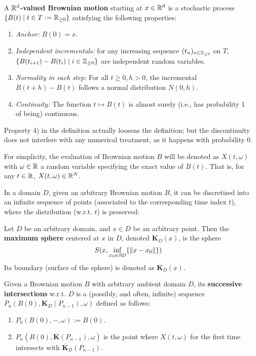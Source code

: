 \documentclass[10pt]{article}
\begin{document}
\begin{definition}
    A \textbf{$\mathbb{R}^d$-valued Brownian motion} starting at $x \in \mathbb{R}^d$ is a stochastic process $\{ B(t) \mid t \in T := \mathbb{R}_{\geq 0} \}$ satisfying the following properties:
    \begin{enumerate}[label=\arabic*)]
        \item \emph{Anchor:} $B(0) = x$.
        \item \emph{Independent incrementals:} for any increasing sequence $(t_n)_{n \in \mathbb{Z}_{\geq 0}}$ on $T$, $\{ B(t_{i+1}) - B(t_i) \mid i \in \mathbb{Z}_{\geq 0} \}$ are independent random variables.
        \item \emph{Normality in each step:} For all $t \geq 0, h > 0$, the incremental $B(t + h) - B(t)$ follows a normal distribution $N(0, h)$.
        \item \emph{Continuity:} The function $t \mapsto B(t)$ is almost surely (i.e., has probability 1 of being) continuous.
    \end{enumerate}
\end{definition}
\nogap
\begin{remark}
    Property 4) in the definition actually loosens the definition; but the discontinuity does not interfere with any numerical treatment, as it happens with probability 0.
\end{remark}
\nogap
\begin{notation}
For simplicity, the evaluation of Brownian motion $B$ will be denoted as $X(t, \omega)$ with $\omega \in \mathbb{R}$ a random variable specifying the exact value of $B(t)$. That is, for any $t \in \mathbb{R}$, $X(t, \omega) \in \mathbb{R}^N$. 
\end{notation}

\textstart
In a domain $D$, given an arbitrary Brownian motion $B$, it can be discretized into an infinite sequence of points (associated to the corresponding time index $t$), where the distribution (w.r.t. $t$) is preserved:

\begin{definition}
    Let $D$ be an arbitrary domain, and $x \in D$ be an arbitrary point. Then the \textbf{maximum sphere} centered at $x$ in $D$, denoted $\bm{K}_D(x)$, is the sphere
    \[
        S(x, \inf_{x_0 \in \partial D} \{ \left\|x - x_0\right\| \})
    \]
    Its boundary (surface of the sphere) is denoted as $\overline{\bm{K}}_D(x)$.
\end{definition}
\nogap
\begin{definition}
    Given a Brownian motion $B$ with arbitrary ambient domain $D$, its \textbf{successive intersections} w.r.t. $D$ is a (possibly, and often, infinite) sequence $P_n(B(0), \bm{K}_D(P_{n-1}), \omega)$ defined as follows:
    \begin{enumerate}
        \item $P_0(B(0), -, \omega) := B(0)$.
        \item $P_{n}(B(0), \overline{\bm{K}}(P_{n-1}), \omega)$ is the point where $X(t, \omega)$ for the first time intersects with $\overline{\bm{K}}_D(P_{n-1})$. 
    \end{enumerate}
\end{definition}
\end{document}
